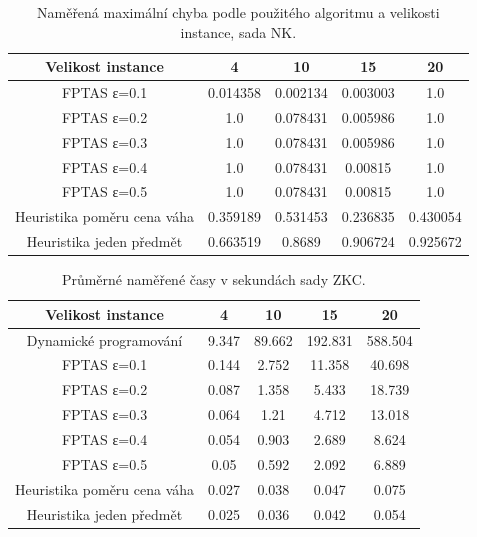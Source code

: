 \documentclass[12pt]{article}
\begin{document}
\begin{table}[h!]
\centering
\begin{tabular}{ | c | | c | c | c | c | }\hline
Velikost instance & 4 & 10 & 15 & 20 \\ \hline \hline
FPTAS ε=0.1 & 0.014358 & 0.002134 & 0.003003 & 1.0  \\ \hline
FPTAS ε=0.2 & 1.0 & 0.078431 & 0.005986 & 1.0  \\ \hline
FPTAS ε=0.3 & 1.0 & 0.078431 & 0.005986 & 1.0  \\ \hline
FPTAS ε=0.4 & 1.0 & 0.078431 & 0.00815 & 1.0  \\ \hline
FPTAS ε=0.5 & 1.0 & 0.078431 & 0.00815 & 1.0  \\ \hline
Heuristika poměru cena váha & 0.359189 & 0.531453 & 0.236835 & 0.430054  \\ \hline
Heuristika jeden předmět & 0.663519 & 0.8689 & 0.906724 & 0.925672  \\ \hline
\end{tabular}
\caption{Naměřená maximální chyba podle použitého algoritmu a velikosti instance, sada  NK.}
\label{NK_error_table}
\end{table}

\begin{table}[h!]
\centering
\begin{tabular}{ | c | | c | c | c | c | }\hline
Velikost instance & 4 & 10 & 15 & 20 \\ \hline \hline
Dynamické programování & 9.347 & 89.662 & 192.831 & 588.504  \\ \hline
FPTAS ε=0.1 & 0.144 & 2.752 & 11.358 & 40.698  \\ \hline
FPTAS ε=0.2 & 0.087 & 1.358 & 5.433 & 18.739  \\ \hline
FPTAS ε=0.3 & 0.064 & 1.21 & 4.712 & 13.018  \\ \hline
FPTAS ε=0.4 & 0.054 & 0.903 & 2.689 & 8.624  \\ \hline
FPTAS ε=0.5 & 0.05 & 0.592 & 2.092 & 6.889  \\ \hline
Heuristika poměru cena váha & 0.027 & 0.038 & 0.047 & 0.075  \\ \hline
Heuristika jeden předmět & 0.025 & 0.036 & 0.042 & 0.054  \\ \hline
\end{tabular}
\caption{Průměrné naměřené časy v sekundách sady ZKC.}
\label{ZKC_table}
\end{table}
\end{document}
